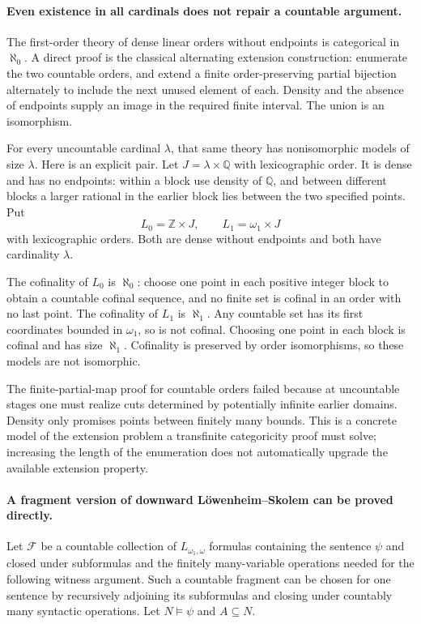 \documentclass[11pt]{article}
\begin{document}
\paragraph{Even existence in all cardinals does not repair a countable argument.}
The first-order theory of dense linear orders without endpoints is
categorical in $\aleph_0$. A direct proof is the classical alternating
extension construction: enumerate the two countable orders, and extend
a finite order-preserving partial bijection alternately to include the
next unused element of each. Density and the absence of endpoints
supply an image in the required finite interval. The union is an
isomorphism.

For every uncountable cardinal $\lambda$, that same theory has
nonisomorphic models of size $\lambda$. Here is an explicit pair.
Let $J=\lambda\times\mathbb Q$ with lexicographic order. It is dense
and has no endpoints: within a block use density of $\mathbb Q$,
and between different blocks a larger rational in the earlier block
lies between the two specified points. Put
\[
 L_0=\mathbb Z\times J,\qquad L_1=\omega_1\times J
\]
with lexicographic orders. Both are dense without endpoints and both
have cardinality $\lambda$.

The cofinality of $L_0$ is $\aleph_0$: choose one point in each
positive integer block to obtain a countable cofinal sequence, and
no finite set is cofinal in an order with no last point. The cofinality
of $L_1$ is $\aleph_1$. Any countable set has its first coordinates
bounded in $\omega_1$, so is not cofinal. Choosing one point in each
block is cofinal and has size $\aleph_1$. Cofinality is preserved by
order isomorphisms, so these models are not isomorphic.

The finite-partial-map proof for countable orders failed because at
uncountable stages one must realize cuts determined by potentially
infinite earlier domains. Density only promises points between finitely
many bounds. This is a concrete model of the extension problem a
transfinite categoricity proof must solve; increasing the length of
the enumeration does not automatically upgrade the available extension
property.

\paragraph{A fragment version of downward Löwenheim--Skolem can be proved directly.}
Let $\mathcal F$ be a countable collection of
$L_{\omega_1,\omega}$ formulas containing the sentence $\psi$ and
closed under subformulas and the finitely many-variable operations
needed for the following witness argument. Such a countable fragment
can be chosen for one sentence by recursively adjoining its subformulas
and closing under countably many syntactic operations. Let
$N\models\psi$ and $A\subseteq N$.
\end{document}
